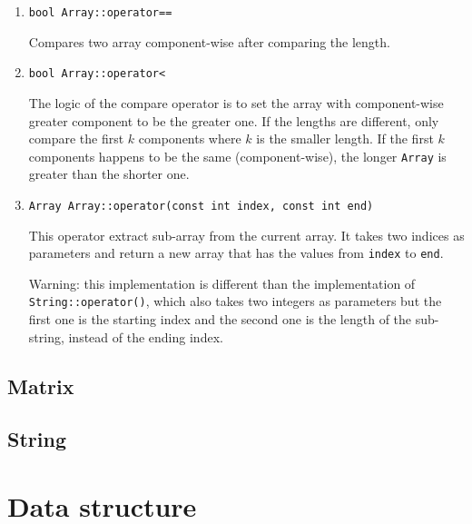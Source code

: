 \documentclass[11pt,a4paper]{article}
\theoremstyle{definition}
\theoremstyle{definition}
\numberwithin{equation}{section}
\begin{document}
\begin{enumerate}
		\item \texttt{bool Array::operator==}
		
		Compares two array component-wise after comparing the length.
		
		\item \texttt{bool Array::operator<}
		
		The logic of the compare operator is to set the array with component-wise greater component to be the greater one. If the lengths are different, only compare the first $k$ components where $k$ is the smaller length. If the first $k$ components happens to be the same (component-wise), the longer \texttt{Array} is greater than the shorter one. 
		
		\item \texttt{Array Array::operator(const int index, const int end)}
		
		This operator extract sub-array from the current array. It takes two indices as parameters and return a new array that has the values from \texttt{index} to \texttt{end}.
		
		Warning: this implementation is different than the implementation of \texttt{String::operator()}, which also takes two integers as parameters but the first one is the starting index and the second one is the length of the sub-string, instead of the ending index.
		
	\end{enumerate}
	
	\subsection{Matrix}
	
	\subsection{String}
	
	\section*{Data structure}
	
\end{document}
